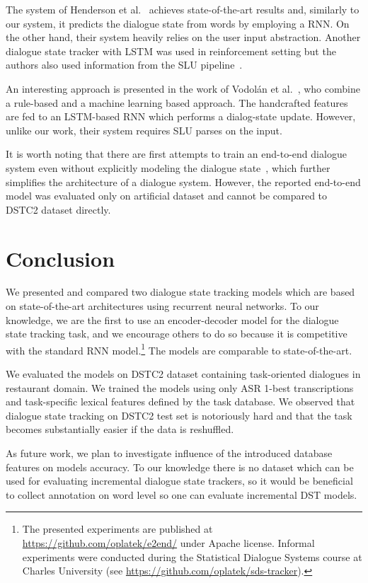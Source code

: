 \documentclass{itatnew}
\begin{document}
The system of Henderson et al.~\cite{henderson2014word} achieves state-of-the-art results and, similarly to our system, it predicts the dialogue state from words by employing a RNN.
On the other hand, their system heavily relies on the user input abstraction.
Another dialogue state tracker with LSTM was used in reinforcement setting but the authors also used information from the SLU pipeline~\cite{lee2016dialog}.

An interesting approach is presented in the work of Vodolán et al.~\cite{vodolan2015hybrid}, who combine a rule-based and a machine learning based approach.
The handcrafted features are fed to an LSTM-based RNN which performs a dialog-state update.
However, unlike our work, their system requires SLU parses on the input.

It is worth noting that there are first attempts to train an end-to-end dialogue system even without explicitly modeling the dialogue state~\cite{bordes2016learning}, which further simplifies the architecture of a dialogue system.
However, the reported end-to-end model was evaluated only on artificial dataset and cannot be compared to DSTC2 dataset directly.

\section{Conclusion}\label{sec:conc}
We presented and compared two dialogue state tracking models which are based on state-of-the-art architectures using recurrent neural networks.
To our knowledge, we are the first to use an encoder-decoder model for the dialogue state tracking task, and we encourage others to do so because it is competitive with the standard RNN model.\footnote{The presented experiments are published at \url{https://github.com/oplatek/e2end/} under Apache license. Informal experiments were conducted during the Statistical Dialogue Systems course at Charles University (see \url{https://github.com/oplatek/sds-tracker}).}
The models are comparable to state-of-the-art.

We evaluated the models on DSTC2 dataset containing task-oriented dialogues in restaurant domain. 
We trained the models using only ASR 1-best transcriptions and task-specific lexical features defined by the task database.
We observed that dialogue state tracking on DSTC2 test set is notoriously hard and that the task becomes substantially easier if the data is reshuffled.

As future work, we plan to investigate influence of the introduced database features on models accuracy.
To our knowledge there is no dataset which can be used for evaluating incremental dialogue state trackers, so it would be beneficial to collect annotation on word level so one can evaluate incremental DST models.

\newpage


\end{document}
